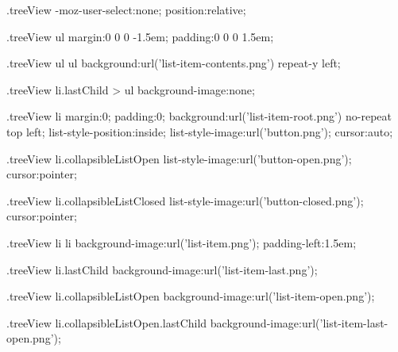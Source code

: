 

\CssFile

      .treeView{
        -moz-user-select:none;
        position:relative;
      }

      .treeView ul{
        margin:0 0 0 -1.5em;
        padding:0 0 0 1.5em;
      }

      .treeView ul ul{
        background:url('list-item-contents.png') repeat-y left;
      }

      .treeView li.lastChild > ul{
        background-image:none;
      }

      .treeView li{
        margin:0;
        padding:0;
        background:url('list-item-root.png') no-repeat top left;
        list-style-position:inside;
        list-style-image:url('button.png');
        cursor:auto;
      }

      .treeView li.collapsibleListOpen{
        list-style-image:url('button-open.png');
        cursor:pointer;
      }

      .treeView li.collapsibleListClosed{
        list-style-image:url('button-closed.png');
        cursor:pointer;
      }

      .treeView li li{
        background-image:url('list-item.png');
        padding-left:1.5em;
      }

      .treeView li.lastChild{
        background-image:url('list-item-last.png');
      }

      .treeView li.collapsibleListOpen{
        background-image:url('list-item-open.png');
      }

      .treeView li.collapsibleListOpen.lastChild{
        background-image:url('list-item-last-open.png');
      }

\EndCssFile




